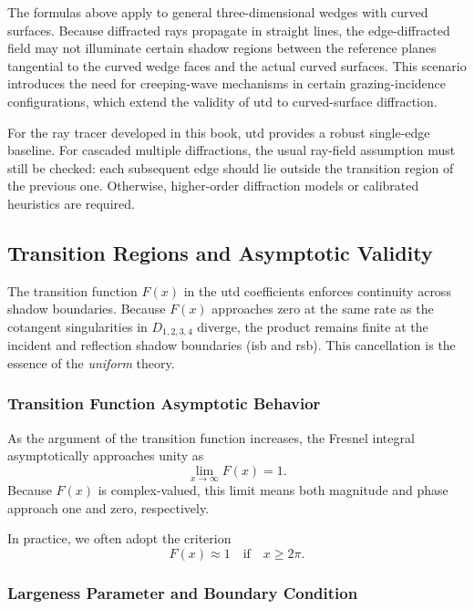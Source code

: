 The formulas above apply to general three-dimensional wedges with curved surfaces. Because diffracted rays propagate in straight lines, the edge-diffracted field may not illuminate certain \glspl{shadow region} between the reference planes tangential to the curved wedge faces and the actual curved surfaces. This scenario introduces the need for creeping-wave mechanisms in certain grazing-incidence configurations, which extend the validity of \gls{utd} to curved-surface diffraction.

For the ray tracer developed in this book, \gls{utd} provides a robust single-edge baseline. For cascaded multiple diffractions, the usual ray-field assumption must still be checked: each subsequent edge should lie outside the transition region of the previous one. Otherwise, higher-order diffraction models or calibrated heuristics are required.

\subsection{Transition Regions and Asymptotic Validity}

The transition function $F(x)$ in the \gls{utd} coefficients enforces continuity across shadow boundaries. Because $F(x)$ approaches zero at the same rate as the cotangent singularities in $D_{1,2,3,4}$ diverge, the product remains finite at the incident and reflection shadow boundaries (\gls{isb} and \gls{rsb}). This cancellation is the essence of the \emph{uniform} theory.

\subsubsection{Transition Function Asymptotic Behavior}

As the argument of the transition function increases, the Fresnel integral asymptotically approaches unity as
\begin{equation}
  \lim_{x \to \infty} F(x) = 1.
\end{equation}
Because $F(x)$ is complex-valued, this limit means both magnitude and phase approach one and zero, respectively.

In practice, we often adopt the criterion~
\begin{equation}
  F(x) \approx 1 \quad \text{if} \quad x \ge 2\pi.
\end{equation}

\subsubsection{Largeness Parameter and Boundary Condition}

